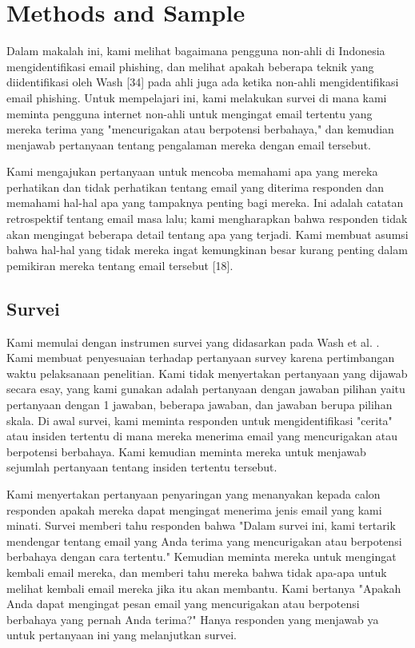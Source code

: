 \documentclass[lettersize,journal]{IEEEtran}
\begin{document}
\section{Methods and Sample}

Dalam makalah ini, kami melihat bagaimana pengguna non-ahli di Indonesia mengidentifikasi
email phishing, dan melihat apakah beberapa teknik yang diidentifikasi oleh
Wash [34] pada ahli juga ada ketika non-ahli mengidentifikasi email phishing.
Untuk mempelajari ini, kami melakukan survei di mana kami meminta pengguna
internet non-ahli untuk mengingat email tertentu yang mereka terima yang
"mencurigakan atau berpotensi berbahaya," dan kemudian menjawab pertanyaan
tentang pengalaman mereka dengan email tersebut.

Kami mengajukan pertanyaan untuk mencoba memahami apa yang mereka perhatikan
dan tidak perhatikan tentang email yang diterima responden dan memahami hal-hal
apa yang tampaknya penting bagi mereka. Ini adalah catatan retrospektif tentang
email masa lalu; kami mengharapkan bahwa responden tidak akan mengingat
beberapa detail tentang apa yang terjadi. Kami membuat asumsi bahwa hal-hal
yang tidak mereka ingat kemungkinan besar kurang penting dalam pemikiran mereka
tentang email tersebut [18].

\subsection{Survei}
Kami memulai dengan instrumen survei yang didasarkan pada Wash
et al. \cite{ref10}. Kami membuat penyesuaian terhadap pertanyaan survey karena  
pertimbangan waktu pelaksanaan penelitian. Kami tidak menyertakan pertanyaan 
yang dijawab secara esay, yang kami gunakan adalah pertanyaan dengan jawaban 
pilihan yaitu pertanyaan dengan 1 jawaban, beberapa jawaban, dan jawaban berupa 
pilihan skala. Di awal survei, kami meminta responden untuk mengidentifikasi
"cerita" atau insiden tertentu di mana mereka menerima email yang mencurigakan
atau berpotensi berbahaya. Kami kemudian meminta mereka untuk menjawab sejumlah
pertanyaan tentang insiden tertentu tersebut.

Kami menyertakan pertanyaan penyaringan yang menanyakan kepada calon responden
apakah mereka dapat mengingat menerima jenis email yang kami minati. Survei
memberi tahu responden bahwa "Dalam survei ini, kami tertarik mendengar tentang
email yang Anda terima yang mencurigakan atau berpotensi berbahaya dengan cara
tertentu." Kemudian meminta mereka untuk mengingat kembali email mereka, dan
memberi tahu mereka bahwa tidak apa-apa untuk melihat kembali email mereka jika
itu akan membantu. Kami bertanya "Apakah Anda dapat mengingat pesan email yang
mencurigakan atau berpotensi berbahaya yang pernah Anda terima?" Hanya
responden yang menjawab ya untuk pertanyaan ini yang melanjutkan survei.
\end{document}
